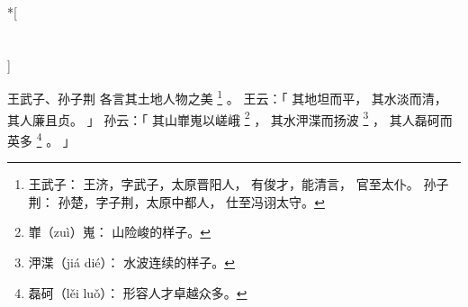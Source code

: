 
\switchcolumn[0]*[\section{}]

王武子、孙子荆
各言其土地人物之美%
\footnote{%
    王武子：
        王济，字武子，太原晋阳人，
        有俊才，能清言，
        官至太仆。
    孙子荆：
        孙楚，字子荆，太原中都人，
        仕至冯诩太守。
}%
。
王云：「
    其地坦而平，
    其水淡而清，
    其人廉且贞。
」
孙云：「
    其山㠑嵬以嵯峨%
    \footnote{%
        㠑（zuì）嵬：
            山险峻的样子。
    }%
    ，
    其水㳌渫而扬波%
    \footnote{%
        㳌渫（jiá dié）：
            水波连续的样子。
    }%
    ，
    其人磊砢而英多%
    \footnote{%
        磊砢（lěi luǒ）：
            形容人才卓越众多。
    }%
    。
」

\switchcolumn



